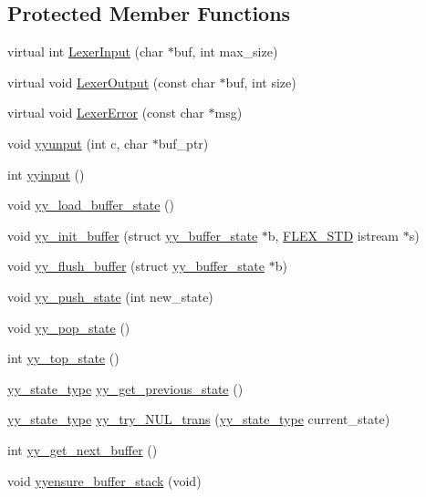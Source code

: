 \subsection*{Protected Member Functions}
\begin{DoxyCompactItemize}
\item 
virtual int \hyperlink{classyyFlexLexer_a285bb6cb3d9132ec16e2cbd3fb766ae9}{Lexer\+Input} (char $\ast$buf, int max\+\_\+size)
\item 
virtual void \hyperlink{classyyFlexLexer_ae037fa792625995f3f7b4dc65769d8f8}{Lexer\+Output} (const char $\ast$buf, int size)
\item 
virtual void \hyperlink{classyyFlexLexer_a8e3e041273a08400c0da07781f6682cf}{Lexer\+Error} (const char $\ast$msg)
\item 
void \hyperlink{classyyFlexLexer_a54064ce670d0caa1a45c5656d5e11538}{yyunput} (int c, char $\ast$buf\+\_\+ptr)
\item 
int \hyperlink{classyyFlexLexer_a4560699d55cb842ea01ca38e595afd95}{yyinput} ()
\item 
void \hyperlink{classyyFlexLexer_acc37b2da3bc88ae411e2009c8a534ee3}{yy\+\_\+load\+\_\+buffer\+\_\+state} ()
\item 
void \hyperlink{classyyFlexLexer_a4e12c1075d2e20c6de18c1220b0d90e2}{yy\+\_\+init\+\_\+buffer} (struct \hyperlink{structyy__buffer__state}{yy\+\_\+buffer\+\_\+state} $\ast$b, \hyperlink{FlexLexer_8h_ae50ff830f34b9e244163babb41a1552d}{F\+L\+E\+X\+\_\+\+S\+TD} istream $\ast$s)
\item 
void \hyperlink{classyyFlexLexer_ae2c2e8f3beb40d55311864d867493d68}{yy\+\_\+flush\+\_\+buffer} (struct \hyperlink{structyy__buffer__state}{yy\+\_\+buffer\+\_\+state} $\ast$b)
\item 
void \hyperlink{classyyFlexLexer_a6246bcfbf2bed9f3497d4f6398e11706}{yy\+\_\+push\+\_\+state} (int new\+\_\+state)
\item 
void \hyperlink{classyyFlexLexer_a58ea71e548fedec914d814a3e320efe9}{yy\+\_\+pop\+\_\+state} ()
\item 
int \hyperlink{classyyFlexLexer_aa1ae2fa3798a4d520bc846052207f562}{yy\+\_\+top\+\_\+state} ()
\item 
\hyperlink{FlexLexer_8h_a9ba7c416f135b0f0c1f4addded4616b5}{yy\+\_\+state\+\_\+type} \hyperlink{classyyFlexLexer_a8e2236ff4238b19413f3d19dc6f5a8dd}{yy\+\_\+get\+\_\+previous\+\_\+state} ()
\item 
\hyperlink{FlexLexer_8h_a9ba7c416f135b0f0c1f4addded4616b5}{yy\+\_\+state\+\_\+type} \hyperlink{classyyFlexLexer_ac58babd5c2cb9b7ba0b08cbc0898c89f}{yy\+\_\+try\+\_\+\+N\+U\+L\+\_\+trans} (\hyperlink{FlexLexer_8h_a9ba7c416f135b0f0c1f4addded4616b5}{yy\+\_\+state\+\_\+type} current\+\_\+state)
\item 
int \hyperlink{classyyFlexLexer_a3659121edfbb2d06999b22ca9255fb1a}{yy\+\_\+get\+\_\+next\+\_\+buffer} ()
\item 
void \hyperlink{classyyFlexLexer_a12af5c2b352914fabe55dfa8b1a77a15}{yyensure\+\_\+buffer\+\_\+stack} (void)
\end{DoxyCompactItemize}

